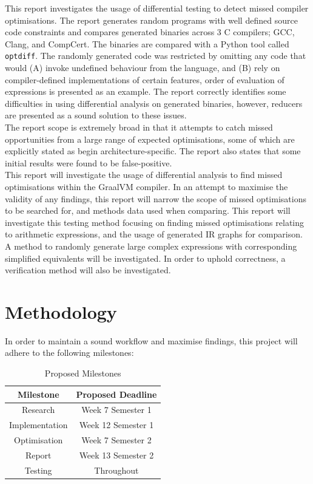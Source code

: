 \documentclass[12pt,openany,a4paper]{book}
\begin{document}
This report investigates the usage of differential testing to detect missed
compiler optimisations. The report generates random programs with well defined
source code constraints and compares generated binaries across 3 C compilers; GCC,
Clang, and CompCert. The binaries are compared with a Python tool called 
\verb|optdiff|. The randomly generated code was restricted by omitting any code
that would (A) invoke undefined behaviour from the language, and (B) rely on 
compiler-defined implementations of certain features, order of evaluation of
expressions is presented as an example. The report correctly identifies some 
difficulties in using differential analysis on generated binaries, however, 
reducers are presented as a sound solution to these issues.\\
The report scope is extremely broad in that it attempts to catch missed
opportunities from a large range of expected optimisations, some of which are
explicitly stated as begin architecture-specific. The report also states that
some initial results were found to be false-positive.\\
This report will investigate the usage of differential analysis to find missed optimisations within the 
GraalVM compiler. In an attempt to maximise the validity of any findings, this report
will narrow the scope of missed optimisations to be searched for, and methods
data used when comparing. This report will investigate this testing method
focusing on finding missed optimisations relating to arithmetic expressions, and
the usage of generated IR graphs for comparison. A method to randomly generate
large complex expressions with corresponding simplified equivalents will be
investigated. In order to uphold correctness, a verification method will also 
be investigated.~\cite{missed-opt}

\chapter{Methodology}
\label{methods}

In order to maintain a sound workflow and maximise findings, this project will
adhere to the following milestones:

\begin{table}[ht]
    \centering
    \begin{tabular}{ |c|c| }
        \hline
        \textbf{Milestone} & \textbf{Proposed Deadline}\\
        \hline
        Research & Week 7 Semester 1\\
        \hline
        Implementation & Week 12 Semester 1\\
        \hline
        Optimisation & Week 7 Semester 2\\
        \hline
        Report & Week 13 Semester 2\\
        \hline
        Testing & Throughout\\
        \hline
    \end{tabular}
    \caption{Proposed Milestones}
    \label{milestones}
\end{table}
\end{document}
